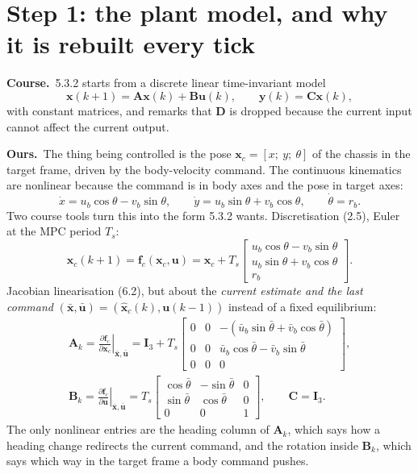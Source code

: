 \documentclass[11pt,a4paper]{article}
\newcommand{\vect}[1]{\bm{#1}}
\newcommand{\mat}[1]{\bm{#1}}
\newcommand{\Ts}{T_s}
\newcommand{\course}{\textbf{\textcolor{blue!60!black}{Course.}}\ }
\newcommand{\ours}{\textbf{\textcolor{green!45!black}{Ours.}}\ }
\begin{document}
\section{Step 1: the plant model, and why it is rebuilt every tick}
\course 5.3.2 starts from a discrete linear time-invariant model
\begin{equation}
\vect x(k+1) = \mat A\vect x(k) + \mat B\vect u(k),\qquad \vect y(k) = \mat C\vect x(k),
\end{equation}
with constant matrices, and remarks that $\mat D$ is dropped because the current input cannot affect the current output.

\ours The thing being controlled is the pose $\vect x_c = [x;\ y;\ \theta]$ of the chassis in the target frame, driven by the body-velocity command. The continuous kinematics are nonlinear because the command is in body axes and the pose in target axes:
\begin{equation}
\dot x = u_b\cos\theta - v_b\sin\theta,\qquad \dot y = u_b\sin\theta + v_b\cos\theta,\qquad \dot\theta = r_b.
\end{equation}
Two course tools turn this into the form 5.3.2 wants. Discretisation (2.5), Euler at the MPC period $\Ts$:
\begin{equation}
\vect x_c(k+1) = \vect f_c(\vect x_c,\vect u) = \vect x_c + \Ts\!\begin{bmatrix}u_b\cos\theta - v_b\sin\theta\\ u_b\sin\theta + v_b\cos\theta\\ r_b\end{bmatrix}\!.
\end{equation}
Jacobian linearisation (6.2), but about the \emph{current estimate and the last command} $(\bar{\vect x}, \bar{\vect u}) = (\hat{\vect x}_c(k), \vect u(k-1))$ instead of a fixed equilibrium:
\begin{gather}
\mat A_k = \left.\frac{\partial\vect f_c}{\partial\vect x_c}\right|_{\bar{\vect x},\bar{\vect u}}
= \mat I_3 + \Ts\begin{bmatrix}0 & 0 & -(\bar u_b\sin\bar\theta + \bar v_b\cos\bar\theta)\\ 0 & 0 & \bar u_b\cos\bar\theta - \bar v_b\sin\bar\theta\\ 0 & 0 & 0\end{bmatrix},\\
\mat B_k = \left.\frac{\partial\vect f_c}{\partial\vect u}\right|_{\bar{\vect x},\bar{\vect u}}
= \Ts\begin{bmatrix}\cos\bar\theta & -\sin\bar\theta & 0\\ \sin\bar\theta & \cos\bar\theta & 0\\ 0 & 0 & 1\end{bmatrix},
\qquad \mat C = \mat I_3.
\end{gather}
The only nonlinear entries are the heading column of $\mat A_k$, which says how a heading change redirects the current command, and the rotation inside $\mat B_k$, which says which way in the target frame a body command pushes.
\end{document}
